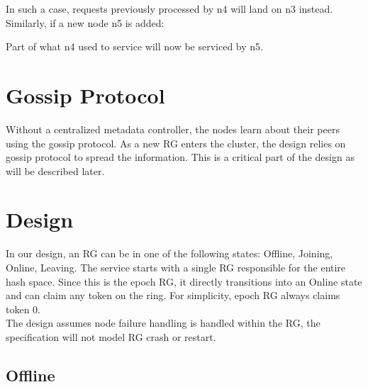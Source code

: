 In such a case, requests previously processed by n4 will land on n3 instead.
Similarly, if a new node n5 is added:

\begin{center}
\end{center}

Part of what n4 used to service will now be serviced by n5.

\section{Gossip Protocol}

Without a centralized metadata controller, the nodes learn about their peers using
the gossip protocol. As a new RG enters the cluster, the design relies on gossip
protocol to spread the information. This is a critical part of the design as
will be described later.

\section{Design}

In our design, an RG can be in one of the following states: Offline, Joining,
Online, Leaving. The service starts with a single RG responsible for the entire
hash space. Since this is the epoch RG, it directly transitions into an Online
state and can claim any token on the ring. For simplicity, epoch RG always
claims token 0.\\

The design assumes node failure handling is handled within the RG, the
specification will not model RG crash or restart. 

\subsection{Offline}

